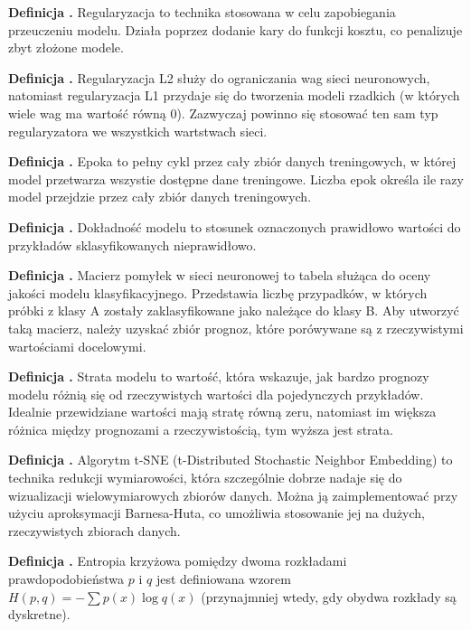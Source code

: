 \noindent
\textbf{Definicja .}
\incrementdefinitionIndex
Regularyzacja to technika stosowana w celu zapobiegania przeuczeniu modelu.
Działa poprzez dodanie kary do funkcji kosztu, co penalizuje zbyt złożone modele.

\noindent
\textbf{Definicja .}
\incrementdefinitionIndex
Regularyzacja L2 służy do ograniczania wag sieci neuronowych,
natomiast regularyzacja L1 przydaje się do tworzenia modeli rzadkich (w których wiele wag ma wartość równą 0). 
Zazwyczaj powinno się stosować ten sam typ regularyzatora we wszystkich wartstwach sieci.

\noindent
\textbf{Definicja .}
\incrementdefinitionIndex
Epoka to pełny cykl przez cały zbiór danych treningowych, w której model przetwarza wszystie dostępne dane treningowe.
Liczba epok określa ile razy model przejdzie przez cały zbiór danych treningowych.

\noindent
\textbf{Definicja .}
\incrementdefinitionIndex
Dokładność modelu to stosunek oznaczonych prawidłowo wartości do przykładów sklasyfikowanych nieprawidłowo.

\noindent
\textbf{Definicja .}
\incrementdefinitionIndex
Macierz pomyłek w sieci neuronowej to tabela służąca do oceny jakości modelu klasyfikacyjnego.
Przedstawia liczbę przypadków, w których próbki z klasy A zostały zaklasyfikowane jako należące do klasy B.
Aby utworzyć taką macierz, należy uzyskać zbiór prognoz, które porówywane są z rzeczywistymi wartościami docelowymi.

\noindent
\textbf{Definicja .}
\incrementdefinitionIndex
Strata modelu to wartość, która wskazuje,
jak bardzo prognozy modelu różnią się od rzeczywistych wartości dla pojedynczych przykładów.
Idealnie przewidziane wartości mają stratę równą zeru,
natomiast im większa różnica między prognozami a rzeczywistością, tym wyższa jest strata.

\noindent
\textbf{Definicja .}
\incrementdefinitionIndex
Algorytm t-SNE (t-Distributed Stochastic Neighbor Embedding) to technika redukcji wymiarowości,
która szczególnie dobrze nadaje się do wizualizacji wielowymiarowych zbiorów danych.
Można ją zaimplementować przy użyciu aproksymacji Barnesa-Huta,
co umożliwia stosowanie jej na dużych, rzeczywistych zbiorach danych.

\noindent
\textbf{Definicja .}
\incrementdefinitionIndex
Entropia krzyżowa pomiędzy dwoma rozkładami prawdopodobieństwa $p$ i $q$ jest definiowana wzorem
$H(p,q) = -\sum p(x) \log q(x) $ (przynajmniej wtedy, gdy obydwa rozkłady są dyskretne).

